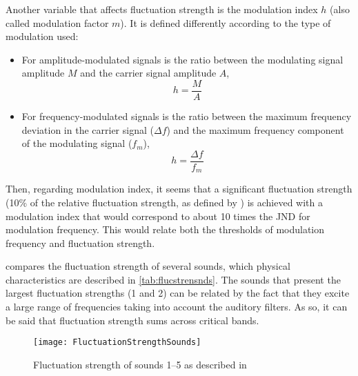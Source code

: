 \documentclass[../main.tex]{subfiles}
\begin{document}
\begin{theoreticalbackground}
Another variable that affects fluctuation strength is the modulation index $h$
(also called modulation factor $m$). It is defined differently according to the
type of modulation used:
\begin{itemize}
    \item For amplitude-modulated signals is the ratio between the modulating
        signal amplitude $M$ and the carrier signal amplitude $A$,
        \begin{equation}
            h=\frac{M}{A}
        \end{equation}
    \item For frequency-modulated signals is the ratio between the maximum
        frequency deviation in the carrier signal ($\Delta f$) and the maximum
        frequency component of the modulating signal ($f_m$),
        \begin{equation}
            h=\frac{\Delta f}{f_m}
        \end{equation}
\end{itemize}

Then, regarding modulation index, it seems that a significant fluctuation
strength (10\% of the relative fluctuation strength, as defined by
\citeauthor{Fastl2007Psychoacoustics}) is achieved with a modulation index that
would correspond to about 10 times the \gls{JND} for modulation frequency. This
would relate both the thresholds of modulation frequency and fluctuation
strength.

 compares the fluctuation strength of several sounds,
which physical characteristics are described in \cref{tab:flucstrensnds}. The
sounds that present the largest fluctuation strengths (1 and 2) can be related
by the fact that they excite a large range of frequencies taking into account
the auditory filters. As so, it can be said that fluctuation strength sums
across critical bands.

\begin{figure}
    \centering
    \texttt{[image: FluctuationStrengthSounds]}
    \caption{Fluctuation strength of sounds 1--5 as described in
         \cite[pp. 252]{Fastl2007Psychoacoustics}}
    \label{fig:flucstrensnds}
\end{figure}


\end{theoreticalbackground}
\end{document}
